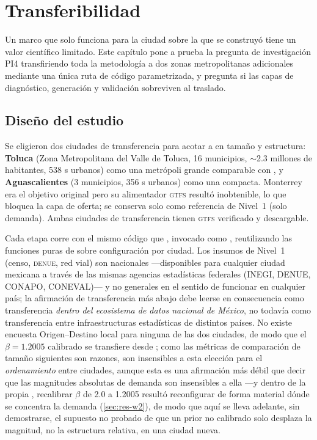 \chapter{Transferibilidad}
\label{ch:transferibilidad}

Un marco que solo funciona para la ciudad sobre la que se construyó tiene un valor
científico limitado. Este capítulo pone a prueba la pregunta de investigación PI4
transfiriendo toda la metodología a dos zonas metropolitanas adicionales mediante una
única ruta de código parametrizada, y pregunta si las capas de diagnóstico,
generación y validación sobreviven al traslado.

\section{Diseño del estudio}
\label{sec:transf-design}

Se eligieron dos ciudades de transferencia para acotar a \zmg en tamaño y estructura:
\textbf{Toluca} (Zona Metropolitana del Valle de Toluca, \num{16} municipios,
$\sim$\num{2.3} millones de habitantes, \num{538} \ageb{}s urbanos) como una metrópoli
grande comparable con \zmg, y \textbf{Aguascalientes} (\num{3} municipios, \num{356}
\ageb{}s urbanos) como una compacta. Monterrey era el objetivo original pero su
alimentador \textsc{gtfs} resultó inobtenible, lo que bloquea la capa de oferta; se
conserva solo como referencia de Nivel~1 (solo demanda). Ambas ciudades de
transferencia tienen \textsc{gtfs} verificado y descargable.

Cada etapa corre con el mismo código que \zmg, invocado como
, reutilizando las funciones puras de \zmg
sobre configuración por ciudad. Los insumos de Nivel~1 (censo, \textsc{denue}, red
vial) son nacionales ---disponibles para cualquier ciudad mexicana a través de las
mismas agencias estadísticas federales (INEGI, DENUE, CONAPO, CONEVAL)--- y no
generales en el sentido de funcionar en cualquier país; la afirmación de transferencia
más abajo debe leerse en consecuencia como transferencia \emph{dentro del ecosistema de
datos nacional de México}, no todavía como transferencia entre infraestructuras
estadísticas de distintos países. No existe encuesta
Origen--Destino local para ninguna de las dos ciudades, de modo que el
$\beta = \num{1.2005}$ calibrado se transfiere desde \zmg; como las métricas de
comparación de tamaño siguientes son razones, son insensibles a esta elección para el
\emph{ordenamiento} entre ciudades, aunque esta es una afirmación más débil que decir
que las magnitudes absolutas de demanda son insensibles a ella ---y dentro de la propia
\zmg, recalibrar $\beta$ de \num{2.0} a \num{1.2005} resultó reconfigurar de forma
material dónde se concentra la demanda (\cref{sec:res-w2}), de modo que aquí se lleva
adelante, sin demostrarse, el supuesto no probado de que un prior no calibrado solo
desplaza la magnitud, no la estructura relativa, en una ciudad nueva.

